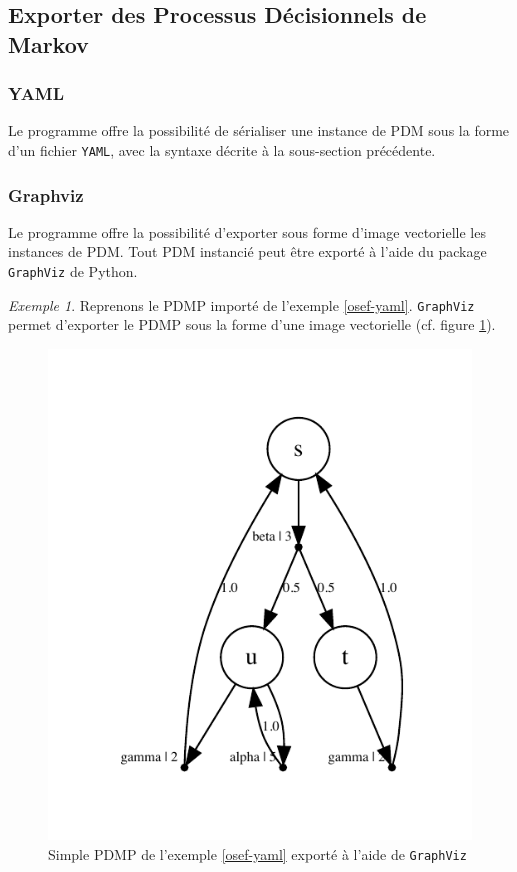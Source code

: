 \documentclass[12pt,a4paper]{report}
\theoremstyle{definition}%
\theoremstyle{remark}
\newtheorem{example}{Exemple}[chapter]
\begin{document}
\subsection{Exporter des Processus Décisionnels de Markov}
\subsubsection*{YAML}
	Le programme offre la possibilité de sérialiser une instance de PDM sous la
	forme d'un fichier \verb|YAML|, avec la syntaxe décrite à la sous-section précédente.
\subsubsection*{Graphviz}
Le programme offre la possibilité d'exporter sous forme d'image vectorielle
les instances de PDM. Tout PDM instancié peut être exporté à l'aide du package
\verb|GraphViz| de Python.

\begin{example}
	Reprenons le PDMP importé de l'exemple \ref{osef-yaml}. \verb|GraphViz| permet
	d'exporter le PDMP sous la forme d'une image vectorielle (cf. figure \ref{osef-graphviz}).
	\begin{figure}[H]
	\centering
		\includegraphics[scale=0.75]{figures/mdp.pdf}
		\cprotect\caption{Simple PDMP de l'exemple \ref{osef-yaml} exporté à l'aide de \verb|GraphViz|}
		\label{osef-graphviz}
	\end{figure}
\end{example}
\end{document}
